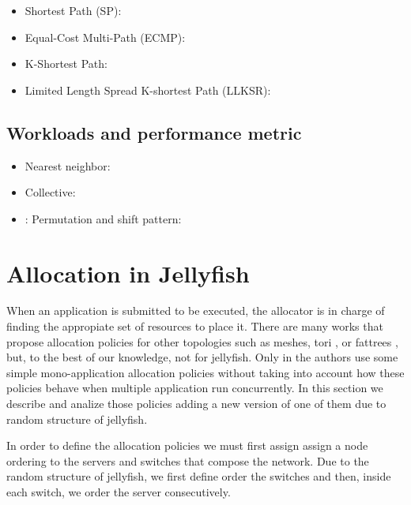 \documentclass{sig-alternate}
\begin{document}
\begin{itemize}
    \item Shortest Path (SP):
    \item Equal-Cost Multi-Path (ECMP):
    \item K-Shortest Path:
    \item Limited Length Spread K-shortest Path (LLKSR):
\end{itemize}

\subsection{Workloads and performance metric}
\label{subsec:workloads}

\begin{itemize}
    \item Nearest neighbor:
    \item Collective:
    \item: Permutation and shift pattern:
\end{itemize}


\section{Allocation in Jellyfish}
\label{allocation}

When an application is submitted to be executed, the allocator is in charge of finding the appropiate set of resources to place it. There are many works that propose allocation policies for other topologies such as meshes, tori \cite{tori} \cite{toritree}, or fattrees \cite{toritree} \cite{trees}, but, to the best of our knowledge, not for jellyfish. Only in \cite{llksp} the authors use some simple mono-application allocation policies without taking into account how these policies behave when multiple application run concurrently. In this section we describe and analize those policies adding a new version of one of them due to random structure of jellyfish.

In order to define the allocation policies we must first assign assign a node ordering to the servers and switches that compose the network. Due to the random structure of jellyfish, we first define order the switches and then, inside each switch, we order the server consecutively.
\end{document}
